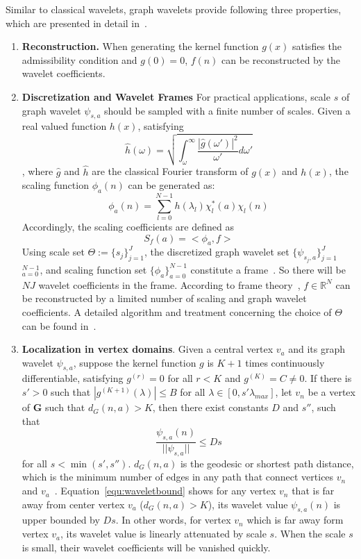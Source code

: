 Similar to classical wavelets, graph wavelets provide following three properties, which are presented in detail in~\cite{hammond2011wavelets}.
 \begin{enumerate}
 \item \textbf{Reconstruction.}
 When generating the kernel function $g(x)$ satisfies the admissibility condition and $g(0)=0$,  $f(n)$ can be reconstructed by the wavelet coefficients.
\item \textbf{Discretization and Wavelet Frames} For practical applications, scale $s$ of graph wavelet $\psi_{s,a}$ should be sampled with a finite number of scales. Given a real valued function $h(x)$, satisfying
\begin{equation}
\hat{h}(\omega) = \sqrt{\int_\omega^\infty\frac{|\hat{g}(\omega')|^2}{\omega'}d{\omega'} }
\end{equation}
, where $\hat{g}$ and $\hat{h}$ are the classical Fourier transform of $g(x)$ and $h(x)$, the scaling function $\phi_{a}(n)$ can be generated as:
\begin{equation}
\label{eq:graphscaledefinition}
\phi_{a}(n) = \sum\limits_{l=0}^{N-1}h(\lambda_l)\chi_l^*(a)\chi_l(n)
\end{equation}
Accordingly, the scaling coefficients are defined as
\begin{equation}
S_f(a)=<\phi_a,f>
\end{equation}
Using scale set $\Theta:=\{s_j\}_{j=1}^J$, the discretized graph wavelet set $\{\psi_{s_j,a}\}_{j=1}^{J}$ $_{a=0}^{N-1}$, and scaling function set $\{\phi_a\}_{a=0}^{N-1}$ constitute a frame~\cite{hammond2011wavelets}.
So there will be $NJ$ wavelet coefficients in the frame.
According to frame theory~\cite{daubechies1992ten}, $f\in \mathbb{R}^N$ can be reconstructed by a limited number of scaling and graph wavelet coefficients. A detailed algorithm and treatment concerning the choice of $\Theta$ can be found in~\cite{hammond2011wavelets}.


\item \textbf{Localization in vertex domains}. Given a central vertex $v_a$ and its graph wavelet $\psi_{s,a}$, suppose the kernel function $g$ is $K+1$ times continuously differentiable, satisfying $g^{(r)}=0$ for all $r<K$ and $g^{(K)}=C\neq 0$. If there is $s'>0$ such that $|g^{(K+1)}(\lambda)|\leq B$ for all $\lambda \in [0, s'\lambda_{max}]$, let $v_n$ be a vertex of $\mathbf{G}$ such that $d_G(n,a)>K$, then there exist constants $D$ and $s''$, such that
\begin{equation}
\label{equ:waveletbound}
\frac{\psi_{s,a}(n)}{||\psi_{s,a}||}\leq Ds
\end{equation} for all $s<\min(s',s'')$.
$d_G(n,a)$ is the geodesic or shortest path distance, which is the minimum number of edges in any path that connect vertices $v_n$ and $v_a$~\cite{hammond2011wavelets}. Equation~\ref{equ:waveletbound} shows for any vertex $v_n$ that is far away from center vertex $v_a$ ($d_G(n,a)>K$), its wavelet value $\psi_{s,a}(n)$ is upper bounded by $Ds$. In other words, for vertex $v_n$ which is far away form vertex $v_a$, its wavelet value is linearly attenuated by scale $s$. When the scale $s$ is small, their wavelet coefficients will be vanished quickly.
 \end{enumerate}

